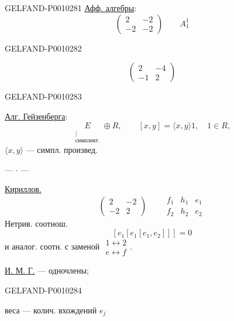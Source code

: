\begin{GelfandAdjacentEvidence}{GELFAND-P001028}{1}
\underline{Афф. алгебры}:
\[
\begin{pmatrix}2&-2\\-2&-2\end{pmatrix}\qquad A_1^1
\]
\end{GelfandAdjacentEvidence}
\begin{GelfandAdjacentEvidence}{GELFAND-P001028}{2}

\[
\begin{pmatrix}2&-4\\-1&2\end{pmatrix}
\]
\end{GelfandAdjacentEvidence}
\begin{GelfandAdjacentEvidence}{GELFAND-P001028}{3}


\underline{Алг. Гейзенберга}:
\[
\underset{\substack{\vert\\\text{симплект.}}}{E}\oplus R,\qquad
[x,y]=\langle x,y\rangle 1,\quad 1\in R,
\]
$\langle x,y\rangle$ --- симпл. произвед.

\begin{center}--- $\cdot$ ---\end{center}

\underline{Кириллов.}
\[
\begin{pmatrix}2&-2\\-2&2\end{pmatrix}\qquad
\begin{array}{ccc}f_1&h_1&e_1\\f_2&h_2&e_2\end{array}
\]
Нетрив. соотнош.
\[
[e_1[e_1[e_1,e_2]]]=0
\]
и аналог. соотн. с заменой \(\begin{array}{c}1\leftrightarrow2\\e\leftrightarrow f\end{array}\).

\underline{И. М. Г.}  --- одночлены;
\end{GelfandAdjacentEvidence}
\begin{GelfandAdjacentEvidence}{GELFAND-P001028}{4}


веса --- колич. вхождений $e_j$
\end{GelfandAdjacentEvidence}
